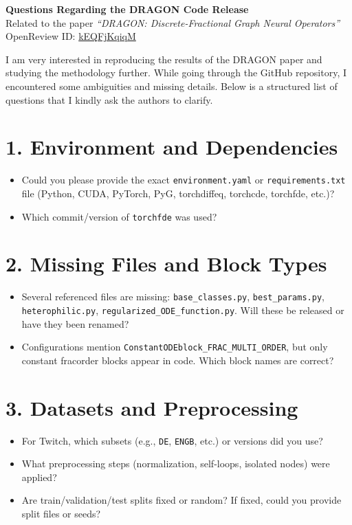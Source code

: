 \documentclass[11pt,a4paper]{article}
\begin{document}
	
	\begin{center}
		{\LARGE \textbf{Questions Regarding the DRAGON Code Release}} \\[0.2cm]
		{\large Related to the paper \textit{``DRAGON: Discrete-Fractional Graph Neural Operators''}} \\
		OpenReview ID: \href{https://openreview.net/forum?id=kEQFjKqiqM}{kEQFjKqiqM}
	\end{center}
	
	\vspace{0.5cm}
	
	I am very interested in reproducing the results of the DRAGON paper and studying the methodology further. 
	While going through the GitHub repository, I encountered some ambiguities and missing details. 
	Below is a structured list of questions that I kindly ask the authors to clarify.
	
	\section*{1. Environment and Dependencies}
	\begin{itemize}[leftmargin=1.5cm]
		\item Could you please provide the exact \texttt{environment.yaml} or \texttt{requirements.txt} file (Python, CUDA, PyTorch, PyG, torchdiffeq, torchcde, torchfde, etc.)?
		\item Which commit/version of \texttt{torchfde} was used?
	\end{itemize}
	
	\section*{2. Missing Files and Block Types}
	\begin{itemize}[leftmargin=1.5cm]
		\item Several referenced files are missing: \texttt{base\_classes.py}, \texttt{best\_params.py}, \texttt{heterophilic.py}, \texttt{regularized\_ODE\_function.py}. Will these be released or have they been renamed?
		\item Configurations mention \texttt{ConstantODEblock\_FRAC\_MULTI\_ORDER}, but only constant fracorder blocks appear in code. Which block names are correct?
	\end{itemize}
	
	\section*{3. Datasets and Preprocessing}
	\begin{itemize}[leftmargin=1.5cm]
		\item For Twitch, which subsets (e.g., \texttt{DE}, \texttt{ENGB}, etc.) or versions did you use?
		\item What preprocessing steps (normalization, self-loops, isolated nodes) were applied?
		\item Are train/validation/test splits fixed or random? If fixed, could you provide split files or seeds?
	\end{itemize}
	
\end{document}
